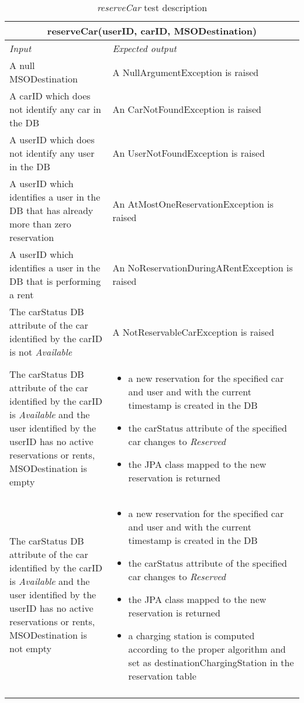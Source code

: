 \begin{longtable}{p{0.35\linewidth}p{0.65\linewidth}}
\multicolumn{2}{c}{\textbf{reserveCar(userID, carID, MSODestination)}} \\
\toprule
\emph{Input} & \emph{Expected output} \\
\midrule
A null MSODestination & A NullArgumentException is raised\\
\midrule
A carID which does not identify any car in the DB & An CarNotFoundException is raised\\
\midrule
A userID which does not identify any user in the DB & An UserNotFoundException is raised\\
\midrule
A userID which identifies a user in the DB that has already more than zero reservation & An AtMostOneReservationException is raised \\
\midrule
A userID which identifies a user in the DB that is performing a rent & An NoReservationDuringARentException is raised \\
\midrule
The carStatus DB attribute of the car identified by the carID is not \emph{Available} & A NotReservableCarException is raised \\
\midrule
The carStatus DB attribute of the car identified by the carID is \emph{Available} and the user identified by the userID has no active reservations or rents, MSODestination is empty & 
\begin{itemize}
	\item a new reservation for the specified car and user and with the current timestamp is created in the DB
	\item the carStatus attribute of the specified car changes to \emph{Reserved}
	\item the JPA class mapped to the new reservation is returned
\end{itemize} \\
\midrule
The carStatus DB attribute of the car identified by the carID is \emph{Available} and the user identified by the userID has no active reservations or rents, MSODestination is not empty & 
\begin{itemize}
	\item a new reservation for the specified car and user and with the current timestamp is created in the DB
	\item the carStatus attribute of the specified car changes to \emph{Reserved}
	\item the JPA class mapped to the new reservation is returned
	\item a charging station is computed according to the proper algorithm and set as destinationChargingStation in the reservation table
\end{itemize}\\
\bottomrule
\caption{\emph{reserveCar} test description}
\end{longtable}


